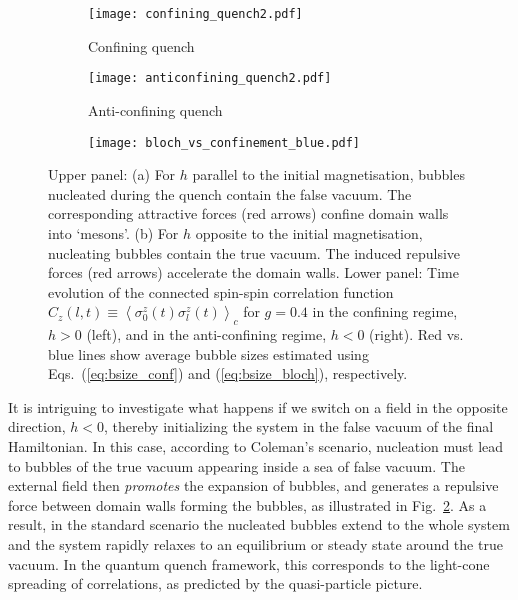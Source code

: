 \documentclass[amsmath,amssymb,11pt]{article}
\numberwithin{equation}{section}
\numberwithin{figure}{section}
\numberwithin{table}{section}
\begin{document}
\begin{figure}
\centering
     \hspace{0cm}
     \begin{subfigure}[b]{0.4\textwidth}
         \centering
         \texttt{[image: confining\_quench2.pdf]}
         \caption{Confining quench}
         \label{fig:confining}
     \end{subfigure}
     \hspace{0.0cm}
     \begin{subfigure}[b]{0.4\textwidth}
         \centering
         \texttt{[image: anticonfining\_quench2.pdf]}
         \caption{Anti-confining quench}
         \label{fig:anticonfining}
     \end{subfigure}
     \begin{subfigure}[b]{1.\textwidth}
        \captionsetup{width=.9\linewidth}
         \texttt{[image: bloch\_vs\_confinement\_blue.pdf]}
     \end{subfigure}
\caption{\label{fig:conf-and-anticonf} 
{Upper panel}: (a) {For $h$ parallel to the initial magnetisation, bubbles nucleated during the quench contain the false vacuum. The corresponding attractive forces (red arrows) confine  domain walls into `mesons'}.
(b) {For  $h$ opposite to the initial magnetisation,  nucleating bubbles contain the true vacuum. The induced repulsive forces (red arrows) accelerate the domain walls.}
{Lower panel}: Time evolution of the connected spin-spin correlation function 
$C_z(l,t)\equiv \left\langle \sigma_{0}^{z}(t)\sigma_{l}^{z}(t)\right\rangle _{c}$
for $g=0.4$ in the confining regime, $h>0$ (left), and in the anti-confining regime, $h<0$ (right). Red vs. blue lines show  average bubble sizes estimated using Eqs.~(\ref{eq:bsize_conf}) and (\ref{eq:bsize_bloch}), respectively.}
\end{figure}

It is intriguing to investigate what happens if we switch on a field in the opposite direction, $h<0$, thereby initializing the system in the false vacuum of the final Hamiltonian. In this case, according to Coleman's scenario, nucleation must lead to bubbles of the true vacuum appearing inside a sea of false vacuum. {The external field then \emph{promotes} the expansion of bubbles, and generates a repulsive force between  domain walls forming the bubbles, as illustrated  in Fig.~\ref{fig:anticonfining}. As a result, in the standard scenario the nucleated bubbles extend to the whole system and the system rapidly relaxes to an equilibrium or steady state around the true vacuum. In the quantum quench framework, this corresponds to the light-cone spreading of correlations, as predicted by the quasi-particle picture.}
\end{document}
